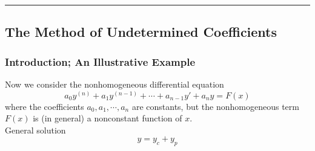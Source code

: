 \vspace{20pt}\rule{3in}{1pt}
\subsection{The Method of Undetermined Coefficients}


\subsubsection{Introduction; An Illustrative Example}

Now we consider the nonhomogeneous differential equation
\begin{equation}
    a_0y^{(n)} + a_1y^{(n-1)} + \cdots + a_{n-1}y' + a_ny = F(x)
\end{equation}
where the coefficients $a_0, a_1, \cdots, a_n$ are constants, but the nonhomogeneous term $F(x)$ is (in general) a nonconstant function of $x$.\\
General solution \[
    y = y_c + y_p
\]

